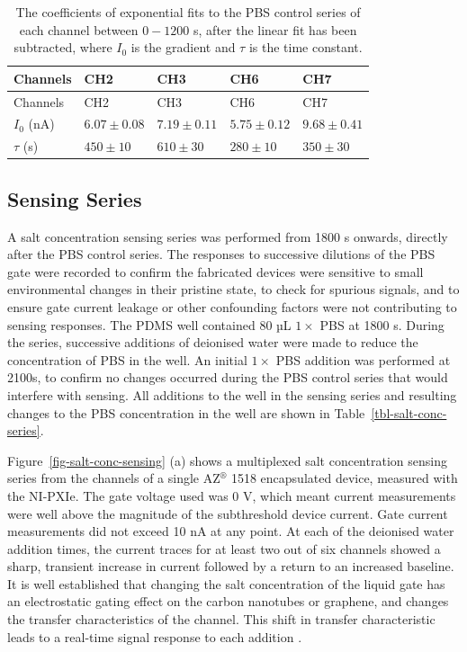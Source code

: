 \documentclass[
  a4paper,
]{scrbook}
\begin{document}
\hypertarget{tbl-exp-fits}{}
\begin{longtable}[]{@{}lllll@{}}
\caption{\label{tbl-exp-fits}The coefficients of exponential fits to the
PBS control series of each channel between \(0-1200\) s, after the
linear fit has been subtracted, where \(I_0\) is the gradient and
\(\tau\) is the time constant.\\
}\tabularnewline
\toprule\noalign{}
Channels & CH2 & CH3 & CH6 & CH7 \\
\midrule\noalign{}
\endfirsthead
\toprule\noalign{}
Channels & CH2 & CH3 & CH6 & CH7 \\
\midrule\noalign{}
\endhead
\bottomrule\noalign{}
\endlastfoot
\(I_0\) (nA) & \(6.07\pm0.08\) & \(7.19\pm0.11\) & \(5.75\pm0.12\) &
\(9.68\pm0.41\) \\
\(\tau\) (s) & \(450\pm10\) & \(610\pm30\) & \(280\pm10\) &
\(350\pm30\) \\
\end{longtable}

\hypertarget{sec-salt-conc-series}{%
\subsection{Sensing Series}\label{sec-salt-conc-series}}

A salt concentration sensing series was performed from 1800 s onwards,
directly after the PBS control series. The responses to successive
dilutions of the PBS gate were recorded to confirm the fabricated
devices were sensitive to small environmental changes in their pristine
state, to check for spurious signals, and to ensure gate current leakage
or other confounding factors were not contributing to sensing responses.
The PDMS well contained 80 µL \(1 \times\) PBS at 1800 s. During the
series, successive additions of deionised water were made to reduce the
concentration of PBS in the well. An initial \(1 \times\) PBS addition
was performed at 2100s, to confirm no changes occurred during the PBS
control series that would interfere with sensing. All additions to the
well in the sensing series and resulting changes to the PBS
concentration in the well are shown in Table~\ref{tbl-salt-conc-series}.

Figure~\ref{fig-salt-conc-sensing} (a) shows a multiplexed salt
concentration sensing series from the channels of a single
AZ\(^\circledR\) 1518 encapsulated device, measured with the NI-PXIe.
The gate voltage used was 0 V, which meant current measurements were
well above the magnitude of the subthreshold device current. Gate
current measurements did not exceed 10 nA at any point. At each of the
deionised water addition times, the current traces for at least two out
of six channels showed a sharp, transient increase in current followed
by a return to an increased baseline. It is well established that
changing the salt concentration of the liquid gate has an electrostatic
gating effect on the carbon nanotubes or graphene, and changes the
transfer characteristics of the channel. This shift in transfer
characteristic leads to a real-time signal response to each addition
\autocite{Heller2009,Heller2010,Kireev2017}.
\end{document}
